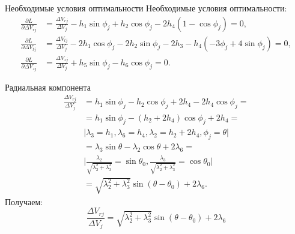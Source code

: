 \documentclass[9pt]{beamer}
\begin{document}
\begin{frame}{Необходимые условия оптимальности}
Необходимые условия оптимальности:
\begin{equation*}
    \begin{aligned}
        \frac{\partial L}{\partial \Delta V_{rj}} &= \frac{\Delta V_{rj}}{\Delta V_j} - h_1 \sin \phi_j + h_2 \cos \phi_j - 2 h_4 (1 - \cos \phi_j) = 0, \\
        \frac{\partial L}{\partial \Delta V_{tj}} &= \frac{\Delta V_{tj}}{\Delta V_j} - 2 h_1 \cos \phi_j - 2 h_2 \sin \phi_j - 2 h_3 - h_4 (-3 \phi_j + 4 \sin \phi_j) = 0, \\
        \frac{\partial L}{\partial \Delta V_{zj}} &= \frac{\Delta V_{zj}}{\Delta V_j} + h_5 \sin \phi_j - h_6 \cos \phi_j = 0.
    \end{aligned}
\end{equation*}
\end{frame}

\begin{frame}{Радиальная компонента}
\begin{equation*}
    \begin{aligned}
        \frac{\Delta V_{rj}}{\Delta V_j} &= h_1 \sin \phi_j - h_2 \cos \phi_j + 2 h_4 - 2 h_4 \cos \phi_j = \\
        &= h_1 \sin \phi_j - (h_2 + 2 h_4) \cos \phi_j + 2 h_4 = \\
        & \vert \lambda_3 = h_1, \lambda_6 = h_4, \lambda_2 = h_2 + 2 h_4, \phi_j = \theta \vert \\
        &= \lambda_3 \sin \theta - \lambda_2 \cos \theta + 2 \lambda_6 = \\
        & \vert \frac{\lambda_2}{\sqrt{\lambda_2^2 + \lambda_3^2}} = \sin \theta_0, \frac{\lambda_3}{\sqrt{\lambda_2^2 + \lambda_3^2}} = \cos \theta_0 \vert \\
        &= \sqrt{\lambda_2^2 + \lambda_3^2} \sin (\theta - \theta_0) + 2 \lambda_6.
    \end{aligned}
\end{equation*}
Получаем:
\begin{equation*}
    \boxed{\frac{\Delta V_{rj}}{\Delta V_j} = \sqrt{\lambda_2^2 + \lambda_3^2} \sin (\theta - \theta_0) + 2 \lambda_6}
\end{equation*}
\end{frame}
\end{document}
